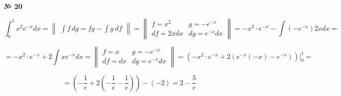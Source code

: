 \documentclass{article}
\begin{document}
\textbf{№ 20} 

$$ \int_{0}^{1} x^2e^{-x} dx 
= \begin{Vmatrix} \int f \,dg = fg - \int g \ df \end{Vmatrix} 
= \begin{Vmatrix} f = x^2 &  g = -e^{-x} \\
                 df = 2xdx  & dg = e^{-x} dx \end{Vmatrix} 
= -x^2 \cdot e^{-x} - \int \left( -e^{-x} \right) 2x dx 
= $$

$$ = -x^2 \cdot e^{-x} + 2\int xe^{-x} dx
= \begin{Vmatrix} f = x &  g = -e^{-x} \\
                 df = dx  & dg = e^{-x} dx \end{Vmatrix} 
= \left( -x^2 \cdot e^{-x} + 2 \left( e^{-x}(-x) - e^{-x} \right) \right) \bigg\vert_{0}^{1}
= $$

$$ = \left( -\frac{1}{e} + 2 \left(-\frac{1}{e} - \frac{1}{e} \right) \right) - \left( -2 \right)
= 2-\frac{5}{e} $$
\end{document}
